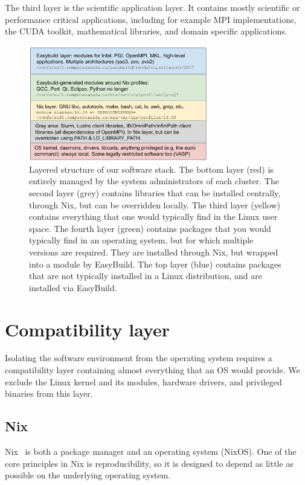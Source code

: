 \documentclass[sigconf]{acmart}
\begin{document}
The third layer is the scientific application layer. It contains mostly scientific or performance critical applications, including for example MPI implementations, the CUDA toolkit, mathematical libraries, and domain specific applications. 

\begin{figure}
  \includegraphics[width=0.7\textwidth]{layers.png}
  \caption{Layered structure of our software stack. The bottom layer (red) is entirely managed by the system administrators of each cluster. The second layer (grey) contains libraries that can be installed centrally, through Nix, but can be overridden locally. The third layer (yellow) contains everything that one would typically find in the Linux user space. The fourth layer (green) contains packages that you would typically find in an operating system, but for which multiple versions are required. They are installed through Nix, but wrapped into a module by EasyBuild. The top layer (blue) contains packages that are not typically installed in a Linux distribution, and are installed via EasyBuild.}
  \label{tab:layers}
\end{figure}

\section{Compatibility layer}
\label{sec:Compatibility_layer}
Isolating the software environment from the operating system requires a compatibility layer containing almost everything that an OS would provide. We exclude the Linux kernel and its modules, hardware drivers, and privileged binaries from this layer.

\subsection{Nix}
\label{sub:Nix}
Nix~\cite{Nix} is both a package manager and an operating system (NixOS). One of the core principles in Nix is reproducibility, so it is designed to depend as little as possible on the underlying operating system. 
\end{document}
